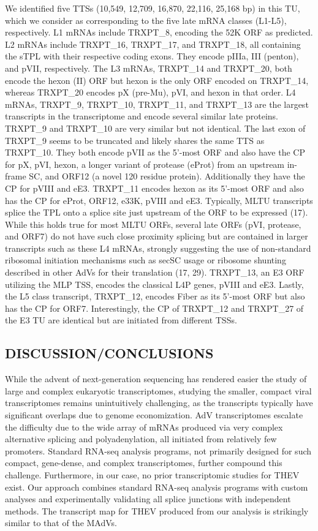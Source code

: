 \documentclass[
]{article}
\begin{document}
We identified five TTSs (10,549, 12,709, 16,870, 22,116, 25,168 bp) in
this TU, which we consider as corresponding to the five late mRNA
classes (L1-L5), respectively. L1 mRNAs include TRXPT\_8, encoding the
52K ORF as predicted. L2 mRNAs include TRXPT\_16, TRXPT\_17, and
TRXPT\_18, all containing the sTPL with their respective coding exons.
They encode pIIIa, III (penton), and pVII, respectively. The L3 mRNAs,
TRXPT\_14 and TRXPT\_20, both encode the hexon (II) ORF but hexon is the
only ORF encoded on TRXPT\_14, whereas TRXPT\_20 encodes pX (pre-Mu),
pVI, and hexon in that order. L4 mRNAs, TRXPT\_9, TRXPT\_10, TRXPT\_11,
and TRXPT\_13 are the largest transcripts in the transcriptome and
encode several similar late proteins. TRXPT\_9 and TRXPT\_10 are very
similar but not identical. The last exon of TRXPT\_9 seems to be
truncated and likely shares the same TTS as TRXPT\_10. They both encode
pVII as the 5'-most ORF and also have the CP for pX, pVI, hexon, a
longer variant of protease (eProt) from an upstream in-frame SC, and
ORF12 (a novel 120 residue protein). Additionally they have the CP for
pVIII and eE3. TRXPT\_11 encodes hexon as its 5'-most ORF and also has
the CP for eProt, ORF12, e33K, pVIII and eE3. Typically, MLTU
transcripts splice the TPL onto a splice site just upstream of the ORF
to be expressed (17). While this holds true for most MLTU ORFs, several
late ORFs (pVI, protease, and ORF7) do not have such close proximity
splicing but are contained in larger transcripts such as these L4 mRNAs,
strongly suggesting the use of non-standard ribosomal initiation
mechanisms such as secSC usage or ribosome shunting described in other
AdVs for their translation (17, 29). TRXPT\_13, an E3 ORF utilizing the
MLP TSS, encodes the classical L4P genes, pVIII and eE3. Lastly, the L5
class transcript, TRXPT\_12, encodes Fiber as its 5'-most ORF but also
has the CP for ORF7. Interestingly, the CP of TRXPT\_12 and TRXPT\_27 of
the E3 TU are identical but are initiated from different TSSs. \newpage

\subsection{DISCUSSION/CONCLUSIONS}\label{discussionconclusions}

While the advent of next-generation sequencing has rendered easier the
study of large and complex eukaryotic transcriptomes, studying the
smaller, compact viral transcriptomes remains unintuitively challenging,
as the transcripts typically have significant overlaps due to genome
economization. AdV transcriptomes escalate the difficulty due to the
wide array of mRNAs produced via very complex alternative splicing and
polyadenylation, all initiated from relatively few promoters. Standard
RNA-seq analysis programs, not primarily designed for such compact,
gene-dense, and complex transcriptomes, further compound this challenge.
Furthermore, in our case, no prior transcriptomic studies for THEV
exist. Our approach combines standard RNA-seq analysis programs with
custom analyses and experimentally validating all splice junctions with
independent methods. The transcript map for THEV produced from our
analysis is strikingly similar to that of the MAdVs.
\end{document}
